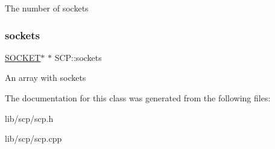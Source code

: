 The number of sockets \hypertarget{class_s_c_p_a0b1f95d779a178ee512c260162b5c9d7}{}\label{class_s_c_p_a0b1f95d779a178ee512c260162b5c9d7} 
\subsubsection{\texorpdfstring{sockets}{sockets}}
{\footnotesize\ttfamily \hyperlink{class_s_o_c_k_e_t}{S\+O\+C\+K\+ET}$\ast$ $\ast$ S\+C\+P\+::sockets\hspace{0.3cm}{\ttfamily [private]}}

An array with sockets 

The documentation for this class was generated from the following files\+:\begin{DoxyCompactItemize}
\item 
lib/scp/scp.\+h\item 
lib/scp/scp.\+cpp\end{DoxyCompactItemize}
